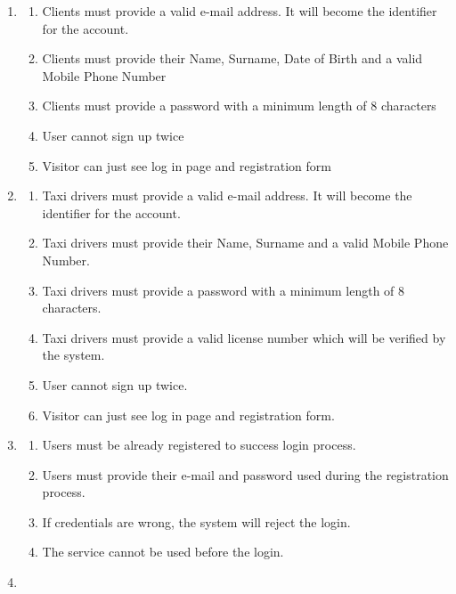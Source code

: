 \documentclass[a4paper]{article}
\begin{document}
\begin{enumerate}[label=\bfseries G\arabic*:]
    \item
        \begin{enumerate}[label=\bfseries R\arabic*:]
        \item Clients must provide a valid e-mail address. It will become the identifier for the account.
        \item Clients must provide their Name, Surname, Date of Birth and a valid Mobile Phone Number
        \item Clients must provide a password with a minimum length of 8 characters
        \item User cannot sign up twice
        \item Visitor can just see log in page and registration form
        \end{enumerate}
    \item
        \begin{enumerate}[label=\bfseries R\arabic*:]
        \item Taxi drivers must provide a valid e-mail address. It will become the identifier for the account.
        \item Taxi drivers must provide their Name, Surname and a valid Mobile Phone Number.
        \item Taxi drivers must provide a password with a minimum length of 8 characters.
        \item Taxi drivers must provide a valid license number which will be verified by the system.
        \item User cannot sign up twice.
        \item Visitor can just see log in page and registration form.
        \end{enumerate}
    \item
        \begin{enumerate}[label=\bfseries R\arabic*:]
        \item Users must be already registered to success login process.
        \item Users must provide their e-mail and password used during the registration process.
        \item If credentials are wrong, the system will reject the login.
        \item The service cannot be used before the login.
        \end{enumerate}
    \item
        \begin{enumerate}[label=\bfseries R\arabic*:]

\end{enumerate}
\end{enumerate}
\end{document}
